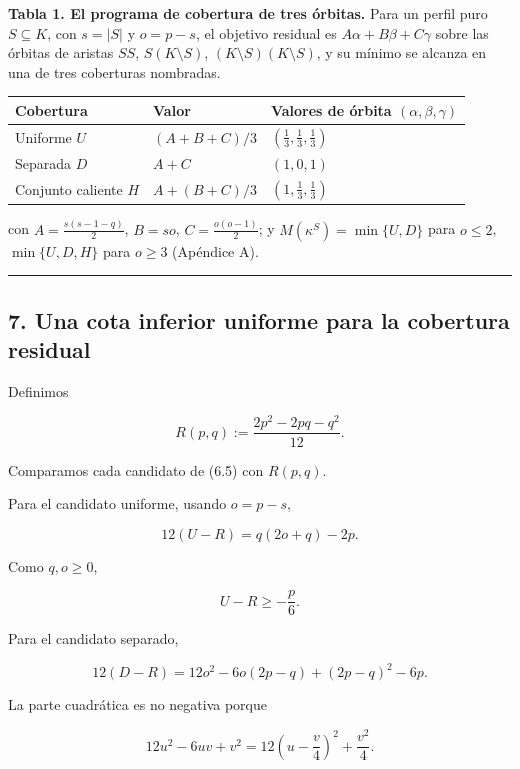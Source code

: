 \documentclass[
  spanish,
  11pt,
  a4paper,
]{article}
\newcounter{none} %
\begin{document}
\textbf{Tabla 1. El programa de cobertura de tres órbitas.} Para un perfil puro \(S\subseteq K\), con \(s=|S|\) y \(o=p-s\), el objetivo residual es \(A\alpha+B\beta+C\gamma\) sobre las órbitas de aristas \(SS\), \(S(K\setminus S)\), \((K\setminus S)(K\setminus S)\), y su mínimo se alcanza en una de tres coberturas nombradas.

{\def\LTcaptype{none} %
\begin{longtable}[]{@{}lll@{}}
\toprule\noalign{}
Cobertura & Valor & Valores de órbita \((\alpha,\beta,\gamma)\) \\
\midrule\noalign{}
\endhead
\bottomrule\noalign{}
\endlastfoot
Uniforme \(U\) & \((A+B+C)/3\) & \((\tfrac13,\tfrac13,\tfrac13)\) \\
Separada \(D\) & \(A+C\) & \((1,0,1)\) \\
Conjunto caliente \(H\) & \(A+(B+C)/3\) & \((1,\tfrac13,\tfrac13)\) \\
\end{longtable}
}

con \(A=\tfrac{s(s-1-q)}2\), \(B=so\), \(C=\tfrac{o(o-1)}2\); y \(M(\kappa^S)=\min\{U,D\}\) para \(o\le2\), \(\min\{U,D,H\}\) para \(o\ge3\) (Apéndice A).

\begin{center}\rule{0.5\linewidth}{0.5pt}\end{center}

\subsection{7. Una cota inferior uniforme para la cobertura residual}\label{una-cota-inferior-uniforme-para-la-cobertura-residual}

Definimos

\[
R(p,q)
:=
\frac{2p^2-2pq-q^2}{12}.
\tag{7.1}
\]

Comparamos cada candidato de (6.5) con \(R(p,q)\).

Para el candidato uniforme, usando \(o=p-s\),

\[
12(U-R)
=
q(2o+q)-2p.
\tag{7.2}
\]

Como \(q,o\ge0\),

\[
U-R\ge-\frac p6.
\tag{7.3}
\]

Para el candidato separado,

\[
12(D-R)
=
12o^2-6o(2p-q)+(2p-q)^2-6p.
\tag{7.4}
\]

La parte cuadrática es no negativa porque

\[
12u^2-6uv+v^2
=
12\left(u-\frac v4\right)^2+\frac{v^2}{4}.
\]
\end{document}
